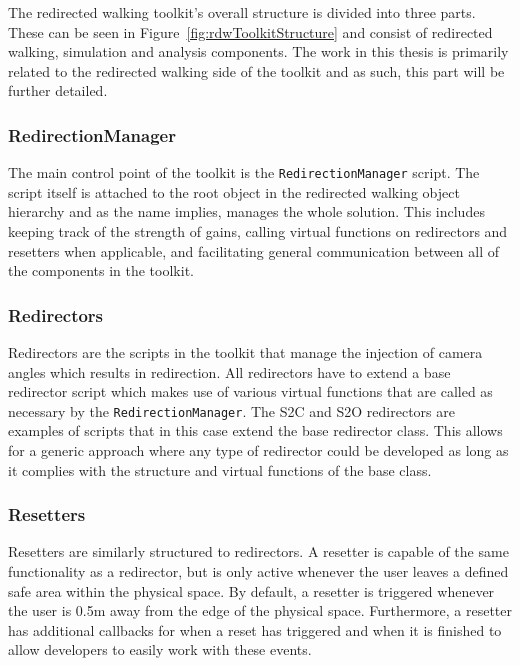 The redirected walking toolkit's overall structure is divided into three parts. These can be seen in Figure~\ref{fig:rdwToolkitStructure} and consist of redirected walking, simulation and analysis components. The work in this thesis is primarily related to the redirected walking side of the toolkit and as such, this part will be further detailed. 

\subsubsection{RedirectionManager}
The main control point of the toolkit is the \lstinline{RedirectionManager} script. The script itself is attached to the root object in the redirected walking object hierarchy and as the name implies, manages the whole solution. This includes keeping track of the strength of gains, calling virtual functions on redirectors and resetters when applicable, and facilitating general communication between all of the components in the toolkit. 

\subsubsection{Redirectors}
Redirectors are the scripts in the toolkit that manage the injection of camera angles which results in redirection. All redirectors have to extend a base redirector script which makes use of various virtual functions that are called as necessary by the \lstinline{RedirectionManager}. The S2C and S2O redirectors are examples of scripts that in this case extend the base redirector class. This allows for a generic approach where any type of redirector could be developed as long as it complies with the structure and virtual functions of the base class. 

\subsubsection{Resetters}
Resetters are similarly structured to redirectors. A resetter is capable of the same functionality as a redirector, but is only active whenever the user leaves a defined safe area within the physical space. By default, a resetter is triggered whenever the user is 0.5m away from the edge of the physical space. Furthermore, a resetter has additional callbacks for when a reset has triggered and when it is finished to allow developers to easily work with these events. 
